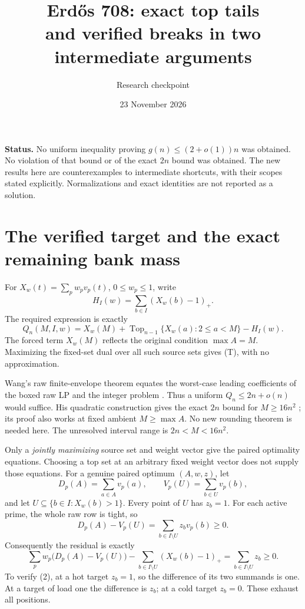 \documentclass[11pt,a4paper]{article}
\title{\vspace{-12mm}Erd\H{o}s 708: exact top tails\\and verified breaks in two intermediate arguments}
\author{Research checkpoint}
\date{23 November 2026}
\newcommand{\pos}[1]{(#1)_+}
\newcommand{\Top}{\operatorname{Top}}
\begin{document}
\maketitle\vspace{-5mm}
\noindent\textbf{Status.}
No uniform inequality proving \(g(n)\le(2+o(1))n\) was obtained.
No violation of that bound or of the exact \(2n\) bound was obtained.
The new results here are counterexamples to intermediate shortcuts,
with their scopes stated explicitly. Normalizations and exact
identities are not reported as a solution.

\section{The verified target and the exact remaining bank mass}
For \(X_w(t)=\sum_pw_pv_p(t)\), \(0\le w_p\le1\), write
\[
 H_I(w)=\sum_{b\in I}\pos{X_w(b)-1}.
\]
The required expression is exactly
\[
 Q_n(M,I,w)=X_w(M)+\Top_{n-1}\{X_w(a):2\le a<M\}-H_I(w).
 \tag{T}
\]
The forced term \(X_w(M)\) reflects the original condition
\(\max A=M\). Maximizing the fixed-set dual over all such source
sets gives (T), with no approximation.

Wang's raw finite-envelope theorem equates the worst-case leading
coefficients of the boxed raw LP and the integer problem
\cite{WangRaw}. Thus a uniform \(Q_n\le2n+o(n)\) would suffice.
His quadratic construction gives the exact \(2n\) bound for
\(M\ge16n^2\) \cite{WangMain}; its proof also works at fixed
ambient \(M\ge\max A\). No new rounding theorem is needed here.
The unresolved interval range is \(2n<M<16n^2\).

Only a \emph{jointly maximizing} source set and weight vector give
the paired optimality equations. Choosing a top set at an arbitrary
fixed weight vector does not supply those equations.
For a genuine paired optimum \((A,w,z)\), let
\[
 D_p(A)=\sum_{a\in A}v_p(a),\qquad
 V_p(U)=\sum_{b\in U}v_p(b),
\]
and let \(U\subseteq\{b\in I:X_w(b)>1\}\).
Every point of \(U\) has \(z_b=1\).
For each active prime, the whole raw row is tight, so
\[
 D_p(A)-V_p(U)
   =\sum_{b\in I\setminus U}z_bv_p(b)\ge0.
 \tag{1}
\]
Consequently the residual is exactly
\[
 \boxed{\ 
 \sum_pw_p\bigl(D_p(A)-V_p(U)\bigr)
 -\sum_{b\in I\setminus U}\pos{X_w(b)-1}
 =\sum_{b\in I\setminus U}z_b\ge0.\ }
 \tag{2}
\]
To verify (2), at a hot target \(z_b=1\), so the difference of its
two summands is one. At a target of load one the difference is
\(z_b\); at a cold target \(z_b=0\). These exhaust all positions.
\end{document}
